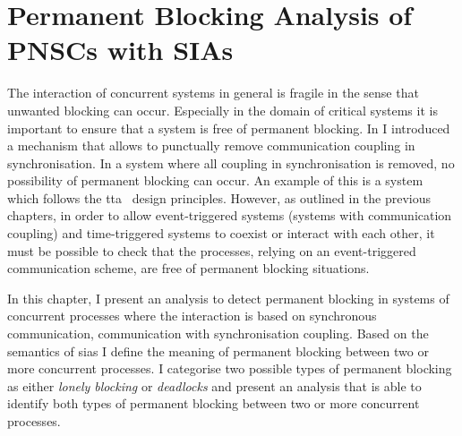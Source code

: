 %


\chapter{Permanent Blocking Analysis of PNSCs with SIAs}
\label{chap_block}
The interaction of concurrent systems in general is fragile in the sense that unwanted blocking can occur.
Especially in the domain of critical systems it is important to ensure that a system is free of permanent blocking.
In \Chap{\ref{chap_tcm}} I introduced a mechanism that allows to punctually remove communication coupling in synchronisation.
In a system where all coupling in synchronisation is removed, no possibility of permanent blocking can occur.
An example of this is a system which follows the \gls{tta}~\cite{kopetz2011c} design principles.
However, as outlined in the previous chapters, in order to allow event-triggered systems (\ie systems with communication coupling) and time-triggered systems to coexist or interact with each other, it must be possible to check that the processes, relying on an event-triggered communication scheme, are free of permanent blocking situations.

In this chapter, I present an analysis to detect permanent blocking in systems of concurrent processes where the interaction is based on synchronous communication, \ie communication with synchronisation coupling.
Based on the semantics of \glspl{sia} I define the meaning of permanent blocking between two or more concurrent processes.
I categorise two possible types of permanent blocking as either {\em lonely blocking} or {\em deadlocks} and present an analysis that is able to identify both types of permanent blocking between two or more concurrent processes.

